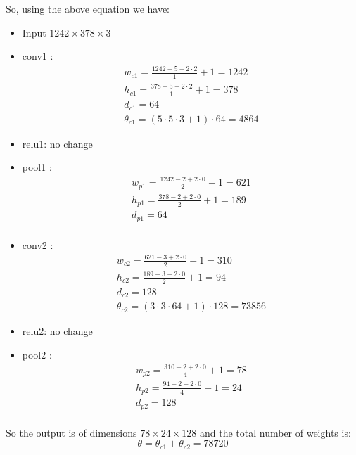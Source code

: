 So, using the above equation we have:
\begin{itemize}
\item Input $1242 \times 378 \times 3$
\item conv1 : 
\begin{equation}
\begin{aligned}
w_{c1}=\frac{1242 -5+2\cdot 2}{1}+1=1242\\
h_{c1}=\frac{378-5 +2\cdot 2}{1}+1=378\\
d_{c1}=64\\
\theta_{c1}=(5\cdot 5\cdot 3+1)\cdot 64=4864
\end{aligned}
\end{equation}
\item relu1: no change
\item pool1 : 
\begin{equation}
\begin{aligned}
w_{p1}=\frac{1242 -2+2\cdot 0}{2}+1=621\\
h_{p1}=\frac{378-2 +2\cdot 0}{2}+1=189\\
d_{p1}=64\\
\end{aligned}
\end{equation}
\item conv2 : 
\begin{equation}
\begin{aligned}
w_{c2}=\frac{621 -3+2\cdot 0}{2}+1=310\\
h_{c2}=\frac{189-3 +2\cdot 0}{2}+1=94\\
d_{c2}=128\\
\theta_{c2}=(3\cdot 3\cdot 64+1)\cdot 128=73856
\end{aligned}
\end{equation}
\item relu2: no change
\item pool2 : 
\begin{equation}
\begin{aligned}
w_{p2}=\frac{310 -2+2\cdot 0}{4}+1=78\\
h_{p2}=\frac{94-2 +2\cdot 0}{4}+1=24\\
d_{p2}=128\\
\end{aligned}
\end{equation}
\end{itemize}

So the output is of dimensions $78\times 24\times 128$ and the total number of weights is:
$$\theta=\theta_{c1}+\theta_{c2}=78720$$


